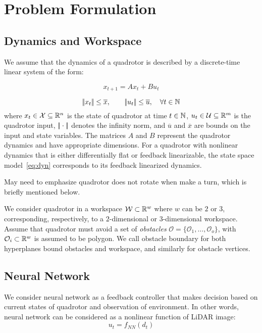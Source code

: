 \section{Problem Formulation}

\subsection{Dynamics and Workspace}

We assume that the dynamics of a quadrotor is described by a discrete-time linear system of the form:

\begin{equation}
    \label{eq:dyn}    
    x_{t+1} = A x_{t} + B u_{t} 
\end{equation}

\begin{equation}
    \label{eq:ulimit}    
    |\!|x_t|\!| \le \overline{x}, \qquad |\!|u_t|\!| \le \overline{u}, \quad \forall t \in {\mathbb{N}}
\end{equation}
where $x_t \in \mathcal{X} \subseteq {\mathbb{R}}^{n}$ is the state of quadrotor at time $t \in {\mathbb{N}}$, 
$u_t \in \mathcal{U} \subseteq {\mathbb{R}}^{m}$ is the quadrotor input, $|\!|\cdot|\!|$ denotes the infinity norm,
and $\overline{u}$ and $\overline{x}$ are bounds on the input and state variables. 
The matrices $A$ and $B$ represent the quadrotor dynamics and have appropriate dimensions. 
For a quadrotor with nonlinear dynamics that is either differentially flat or feedback linearizable, 
the state space model~\eqref{eq:dyn} corresponds to its feedback linearized dynamics.

{\color{blue} May need to emphasize quadrotor does not rotate when make a turn, which is briefly mentioned below.}

We consider quadrotor in a workspace $\mathcal{W} \subset {\mathbb{R}}^{w}$ where $w$ can be $2$ or $3$, 
corresponding,  respectively, to a $2$-dimensional or $3$-dimensional workspace. 
Assume that quadrotor must avoid a set of \emph{obstacles} $\mathcal{O} = \{\mathcal{O}_1, \ldots, \mathcal{O}_o\}$, 
with $\mathcal{O}_i \subset {\mathbb{R}}^w$ is assumed to be polygon.
We call obstacle boundary for both hyperplanes bound obstacles and workspace, and similarly for obstacle vertices. 

\subsection{Neural Network}
We consider neural network as a feedback controller that makes decision based on current states of quadrotor
and observation of environment.
In other words, neural network can be considered as a nonlinear function of LiDAR image:
\begin{equation}    
    \label{eq:nn_nonlinear}    
    u_t = f_{NN}(d_t)
\end{equation}    

